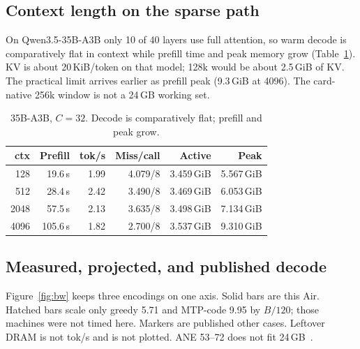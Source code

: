\subsection{Context length on the sparse path}
\label{sec:eval-ctx}

On Qwen3.5-35B-A3B only 10 of 40 layers use full attention, so warm decode is comparatively flat in context while prefill time and peak memory grow (Table~\ref{tab:ctx}). KV is about 20\,KiB/token on that model; 128k would be about 2.5\,GiB of KV. The practical limit arrives earlier as prefill peak (9.3\,GiB at 4096). The card-native 256k window is not a 24\,GB working set.

\begin{table}[t]
\centering
\caption{35B-A3B, $C{=}32$. Decode is comparatively flat; prefill and peak grow.}
\label{tab:ctx}
\small
\begin{tabular}{@{}rrrrrr@{}}
\toprule
ctx & Prefill & tok/s & Miss/call & Active & Peak \\
\midrule
128 & 19.6\,s & 1.99 & 4.079/8 & 3.459\,GiB & 5.567\,GiB \\
512 & 28.4\,s & 2.42 & 3.490/8 & 3.469\,GiB & 6.053\,GiB \\
2048 & 57.5\,s & 2.13 & 3.635/8 & 3.498\,GiB & 7.134\,GiB \\
4096 & 105.6\,s & 1.82 & 2.700/8 & 3.537\,GiB & 9.310\,GiB \\
\bottomrule
\end{tabular}
\end{table}

\subsection{Measured, projected, and published decode}
\label{sec:eval-bw}

Figure~\ref{fig:bw} keeps three encodings on one axis. Solid bars are this Air. Hatched bars scale only greedy 5.71 and MTP-code 9.95 by $B/120$; those machines were not timed here. Markers are published other cases. Leftover DRAM is not tok/s and is not plotted. ANE 53--72 does not fit 24\,GB~\citep{weschera2026}.

